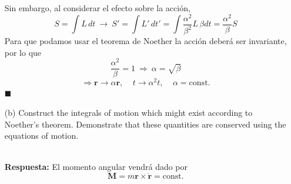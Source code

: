 \documentclass[]{article}
\numberwithin{equation}{section}
\newcommand{\0}{\textcolor{gray}{0}}
\newcommand{\rv}{\mathbf{r}}
\newcommand{\n}[1]{\mathbf{#1}}
\newcommand{\qed}{\hfill\(\blacksquare\)}
\newcommand{\resp}{
	\\
	
	\textbf{Respuesta:} }
\begin{document}
\begin{enumerate}
	Sin embargo, al considerar el efecto sobre la acción,
	\begin{equation*}
		S = \int L \, dt ~\rightarrow~ S' = \int L' \, dt' = \int \frac{\alpha^2}{\beta^2} L \, \beta dt = \frac{\alpha^2}{\beta} S
	\end{equation*}
	Para que podamos usar el teorema de Noether la acción deberá ser invariante, por lo que
	\begin{equation}
		\frac{\alpha^2}{\beta} = 1 ~\Rightarrow~ \alpha = \sqrt{\beta}
	\end{equation}
	\begin{equation*}
		\Rightarrow \rv \rightarrow \alpha \rv, ~~~~~ t\rightarrow \alpha^2 t, ~~~~~ \alpha = \mathrm{const.}
	\end{equation*}
	\qed
	
	\item[(b)] Construct the integrals of motion which might exist according to Noether’s theorem. Demonstrate that these quantities are conserved using the equations of motion.
	\resp El momento angular vendrá dado por
	\begin{equation}
		\n{M} = m\rv\times\dot{\rv} = \mathrm{const.}
	\end{equation}
	

\end{enumerate}
\end{document}
